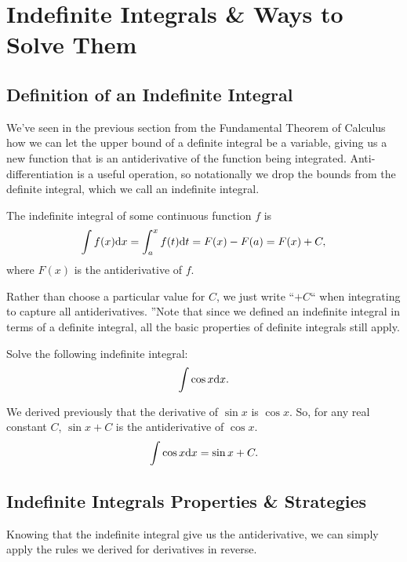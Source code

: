 \section{Indefinite Integrals \& Ways to Solve Them}

\subsection{Definition of an Indefinite Integral}
We've seen in the previous section from the Fundamental Theorem of Calculus how we can let the upper bound of a definite integral be a variable, giving us a new function that is an antiderivative of the function being integrated.
Anti-differentiation is a useful operation, so notationally we drop the bounds from the definite integral, which we call an indefinite integral.
\begin{definition}
	The indefinite integral of some continuous function $f$ is
	\begin{equation*}
		\int{f(x)\mathrm{d} x} = \int_{a}^{x}{f(t)\mathrm{d} t} = F(x) - F(a) = F(x) + C,
	\end{equation*}
	where $F(x)$ is the antiderivative of $f$.
\end{definition}

Rather than choose a particular value for $C$, we just write ``$+C$`` when integrating to capture all antiderivatives.
''Note that since we defined an indefinite integral in terms of a definite integral, all the basic properties of definite integrals still apply.

\begin{example}
	Solve the following indefinite integral:
	\begin{equation*}
		\int{\cos{x}\mathrm{d} x}.
	\end{equation*}
\end{example}
\begin{answer}
	We derived previously that the derivative of $\sin{x}$ is $\cos{x}$.
	So, for any real constant $C$, $\sin{x} + C$ is the antiderivative of $\cos{x}$.
	\begin{equation*}
		\int{\cos{x}\mathrm{d} x} = \sin{x} + C.
	\end{equation*}
\end{answer}

\subsection{Indefinite Integrals Properties \& Strategies}
Knowing that the indefinite integral give us the antiderivative, we can simply apply the rules we derived for derivatives in reverse.


